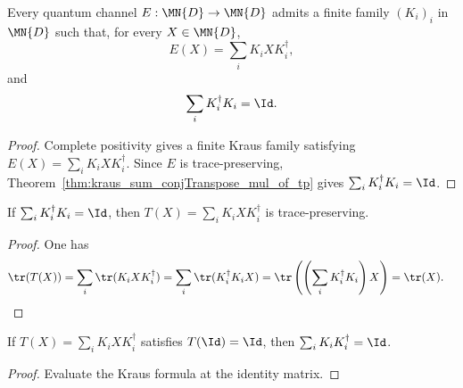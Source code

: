 \begin{theorem}
    \label{thm:exists_kraus_map_eq_and_normalized}
    \leanok
    Every quantum channel $E : \MN{D} \to \MN{D}$ admits a finite family
    $(K_i)_i$ in $\MN{D}$ such that, for every $X \in \MN{D}$,
    \[
        E(X)=\sum_i K_i X K_i^\dagger,
    \]
    and
    \[
        \sum_i K_i^\dagger K_i=\Id.
    \]
\end{theorem}

\begin{proof}
    \leanok
    Complete positivity gives a finite Kraus family satisfying
    $E(X)=\sum_i K_i X K_i^\dagger$. Since $E$ is trace-preserving,
    Theorem~\ref{thm:kraus_sum_conjTranspose_mul_of_tp} gives
    $\sum_i K_i^\dagger K_i=\Id$.
\end{proof}

\begin{theorem}\label{thm:kraus_tp_of_sum_conjTranspose_mul}
    \leanok
    If $\sum_i K_i^\dagger K_i = \Id$, then
    $T(X) = \sum_i K_i X K_i^\dagger$ is trace-preserving.
\end{theorem}

\begin{proof}
    \leanok
    One has
    \begin{align}
        \tr(T(X))
        &= \sum_i \tr(K_i X K_i^\dagger)
         = \sum_i \tr(K_i^\dagger K_i X)
         = \tr\left(\left(\sum_i K_i^\dagger K_i\right)X\right)
         = \tr(X).
        \notag
    \end{align}
\end{proof}

\begin{theorem}
    \label{thm:kraus_sum_mul_conjTranspose_of_unital}
    \leanok
    If $T(X) = \sum_i K_i X K_i^\dagger$ satisfies $T(\Id) = \Id$, then
    $\sum_i K_i K_i^\dagger = \Id$.
\end{theorem}

\begin{proof}\leanok
    Evaluate the Kraus formula at the identity matrix.
\end{proof}

